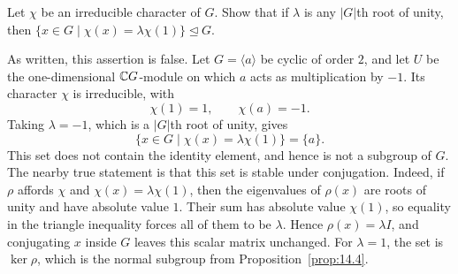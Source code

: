\documentclass[../Odyssey_Project.tex]{subfiles}
\begin{document}
\begin{exercise}
\label{ex:14.5}
Let $\chi$ be an irreducible character of $G$. Show that if $\lambda$ is any $|G|$th root of unity, then $\{x \in G \mid \chi(x) = \lambda \chi(1)\} \trianglelefteq G$.
\end{exercise}
\begin{solution}
    As written, this assertion is false. Let $G=\langle a\rangle$ be cyclic of order $2$, and let $U$ be the one-dimensional $\mathbb{C} G$-module on which $a$ acts as multiplication by $-1$. Its character $\chi$ is irreducible, with
    \[
        \chi(1)=1,\qquad \chi(a)=-1.
    \]
    Taking $\lambda=-1$, which is a $|G|$th root of unity, gives
    \[
        \{x\in G\mid \chi(x)=\lambda\chi(1)\}=\{a\}.
    \]
    This set does not contain the identity element, and hence is not a subgroup of $G$.\\
    The nearby true statement is that this set is stable under conjugation. Indeed, if $\rho$ affords $\chi$ and $\chi(x)=\lambda\chi(1)$, then the eigenvalues of $\rho(x)$ are roots of unity and have absolute value $1$. Their sum has absolute value $\chi(1)$, so equality in the triangle inequality forces all of them to be $\lambda$. Hence $\rho(x)=\lambda I$, and conjugating $x$ inside $G$ leaves this scalar matrix unchanged. For $\lambda=1$, the set is $\ker\rho$, which is the normal subgroup from Proposition~\ref{prop:14.4}.
\end{solution}
\end{document}

